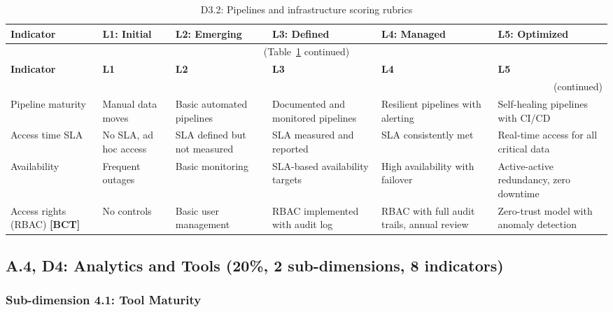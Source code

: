 \begin{center}
{\small
\begin{longtable}{|p{2.4cm}|p{2.0cm}|p{2.0cm}|p{2.2cm}|p{2.2cm}|p{2.2cm}|}
\caption{D3.2: Pipelines and infrastructure scoring rubrics} \label{tab:d3-2} \\
\hline
\textbf{Indicator} & \textbf{L1: Initial} & \textbf{L2: Emerging} & \textbf{L3: Defined} & \textbf{L4: Managed} & \textbf{L5: Optimized} \\
\hline
\endfirsthead
\multicolumn{6}{c}{\small (Table~\ref{tab:d3-2} continued)} \\
\hline
\textbf{Indicator} & \textbf{L1} & \textbf{L2} & \textbf{L3} & \textbf{L4} & \textbf{L5} \\
\hline
\endhead
\hline
\multicolumn{6}{r}{\small (continued)} \\
\endfoot
\hline
\endlastfoot
Pipeline maturity &
  Manual data moves &
  Basic automated pipelines &
  Documented and monitored pipelines &
  Resilient pipelines with alerting &
  Self-healing pipelines with CI/CD \\
\hline
Access time SLA &
  No SLA, ad hoc access &
  SLA defined but not measured &
  SLA measured and reported &
  SLA consistently met &
  Real-time access for all critical data \\
\hline
Availability &
  Frequent outages &
  Basic monitoring &
  SLA-based availability targets &
  High availability with failover &
  Active-active redundancy, zero downtime \\
\hline
Access rights (RBAC) \textbf{[BCT]} &
  No controls &
  Basic user management &
  RBAC implemented with audit log &
  RBAC with full audit trails, annual review &
  Zero-trust model with anomaly detection \\
\hline
\end{longtable}
}
\end{center}


\subsection*{A.4, D4: Analytics and Tools (20\%, 2 sub-dimensions, 8 indicators)}

\subsubsection*{Sub-dimension 4.1: Tool Maturity}

